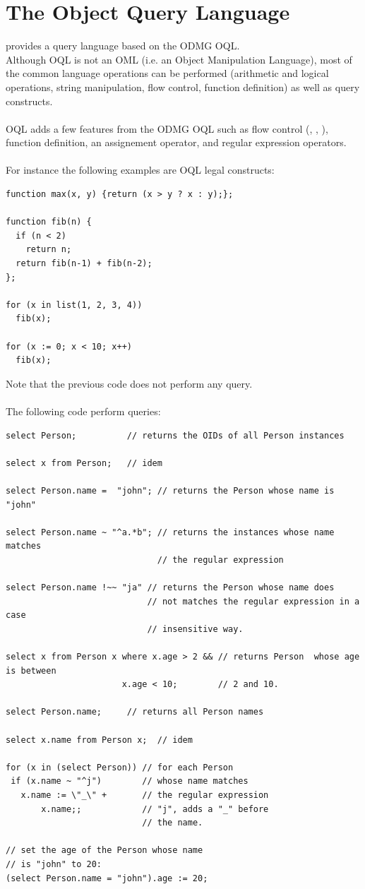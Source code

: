 \section{The Object Query Language}
\eyedb provides a query language based on the ODMG OQL.
\\
Although \eyedb OQL is not an OML (i.e. an Object Manipulation Language),
most of the common language operations can be performed (arithmetic
and logical operations, string manipulation, flow control,
function definition) as well as query constructs.
\\
\\
\eyedb OQL adds a few features from the ODMG OQL such as flow control
(, , ), function definition,
an assignement operator, and regular expression operators.
\\
\\
For instance the following examples are \eyedb OQL legal constructs:
{\verbsize
\begin{verbatim}
function max(x, y) {return (x > y ? x : y);};

function fib(n) {
  if (n < 2)
    return n;
  return fib(n-1) + fib(n-2);
};

for (x in list(1, 2, 3, 4))
  fib(x);

for (x := 0; x < 10; x++)
  fib(x);
\end{verbatim}
}
Note that the previous code does not perform any query.
\\
\\
The following code perform queries:
{\verbsize
\begin{verbatim}
select Person;          // returns the OIDs of all Person instances

select x from Person;   // idem

select Person.name =  "john"; // returns the Person whose name is "john"

select Person.name ~ "^a.*b"; // returns the instances whose name matches
                              // the regular expression

select Person.name !~~ "ja" // returns the Person whose name does
                            // not matches the regular expression in a case
                            // insensitive way.

select x from Person x where x.age > 2 && // returns Person  whose age is between
                       x.age < 10;        // 2 and 10.

select Person.name;     // returns all Person names

select x.name from Person x;  // idem

for (x in (select Person)) // for each Person
 if (x.name ~ "^j")        // whose name matches
   x.name := \"_\" +       // the regular expression
       x.name;;            // "j", adds a "_" before
                           // the name.

// set the age of the Person whose name
// is "john" to 20:
(select Person.name = "john").age := 20;
\end{verbatim}
}
